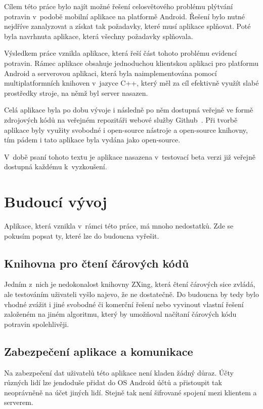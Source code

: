 \documentclass[thesis=B,czech]{FITthesis}[2013/10/20]
\begin{document}
\begin{conclusion}
Cílem této práce bylo najít možné řešení celosvětového problému plýtvání potravin v~podobě mobilní aplikace na platformě Android. Řešení bylo nutné nejdříve zanalyzovat a získat tak požadavky, které musí aplikace splňovat. Poté byla navrhnuta aplikace, která všechny požadavky splňovala.
	
Výsledkem práce vznikla aplikace, která řeší část tohoto problému evidencí potravin. Rámec aplikace obsahuje jednoduchou klientskou aplikaci pro platformu Android a serverovou aplikaci, která byla naimplementována pomocí multiplatformních knihoven v~jazyce C++, který měl za cíl efektivně využít slabé prostředky stroje, na němž byl server nasazen.

Celá aplikace byla po dobu vývoje i následně po něm dostupná veřejně ve formě zdrojových kódů na veřejném repozitáři webové služby Github~\cite{repo}. Při tvorbě aplikace byly využity svobodné i open-source nástroje a open-source knihovny, tím pádem i tato aplikace byla vydána jako open-source.

V~době psaní tohoto textu je aplikace nasazena v~testovací beta verzi již veřejně dostupná každému k~vyzkoušení.

\section{Budoucí vývoj}

Aplikace, která vznikla v~rámci této práce, má mnoho nedostatků. Zde se pokusím popsat ty, které lze do budoucna vyřešit.

\subsection{Knihovna pro čtení čárových kódů}
Jedním z~nich je nedokonalost knihovny ZXing, která čtení čárových sice zvládá, ale testováním uživateli vyšlo najevo, že ne dostatečně. Do budoucna by tedy bylo vhodné zvážit i jiné svobodné či komerční řešení nebo vyvinout vlastní řešení založeném na jiném algoritmu, který by umožňoval načítaní čárových kódu potravin spolehlivěji.

\subsection{Zabezpečení aplikace a komunikace}
Na zabezpečení dat uživatelů této aplikace není kladen žádný důraz. Účty různých lidí lze jendoduše přidat do OS Android účtů a přistoupit tak neoprávněně na účet jiných lidí. Stejně tak není šifrované spojení mezi klientem a serverem.


\end{conclusion}
\end{document}
